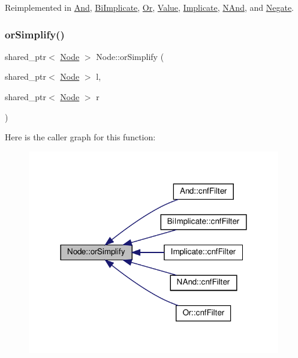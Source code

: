 Reimplemented in \hyperlink{class_and_a790a8f5b095f664f0a879d2bf96c972d}{And}, \hyperlink{class_bi_implicate_aa77f25616aa7a47ae4007d661ad60518}{Bi\+Implicate}, \hyperlink{class_or_a1fc17643b67383ec7be340d278c8e60a}{Or}, \hyperlink{class_value_aaa2ddacd71ab25b50b06eee47e21289d}{Value}, \hyperlink{class_implicate_a9f3b5d35f552a62ca4a98b4f608a2968}{Implicate}, \hyperlink{class_n_and_ae60ecc244dd83bfdcc7eada4957890d8}{N\+And}, and \hyperlink{class_negate_a2dd4cada504739fea3583a5729044c71}{Negate}.

\mbox{\label{class_node_a92e887aab236cfc28d81bdf0fdb9379f}} 
\subsubsection{\texorpdfstring{or\+Simplify()}{orSimplify()}}
{\footnotesize\ttfamily shared\+\_\+ptr$<$ \hyperlink{class_node}{Node} $>$ Node\+::or\+Simplify (\begin{DoxyParamCaption}\item[{shared\+\_\+ptr$<$ \hyperlink{class_node}{Node} $>$}]{l,  }\item[{shared\+\_\+ptr$<$ \hyperlink{class_node}{Node} $>$}]{r }\end{DoxyParamCaption})\hspace{0.3cm}{\ttfamily [protected]}}

Here is the caller graph for this function\+:
\nopagebreak
\begin{figure}[H]
\begin{center}
\leavevmode
\includegraphics[width=312pt]{dc/d8f/class_node_a92e887aab236cfc28d81bdf0fdb9379f_icgraph}
\end{center}
\end{figure}
\mbox{\label{class_node_ae9bb2ba5b99e08fcd6f9aff0814a740f}} 
